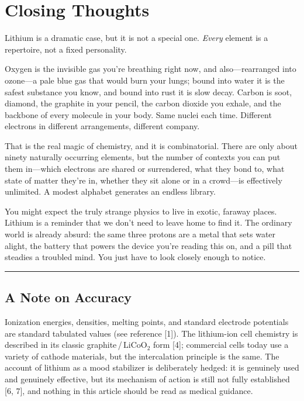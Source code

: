 \documentclass[11pt, letterpaper]{article}
\begin{document}

\section*{Closing Thoughts}

Lithium is a dramatic case, but it is not a special one. \textit{Every} element is a repertoire, not a fixed personality.

Oxygen is the invisible gas you're breathing right now, and also---rearranged into ozone---a pale blue gas that would burn your lungs; bound into water it is the safest substance you know, and bound into rust it is slow decay. Carbon is soot, diamond, the graphite in your pencil, the carbon dioxide you exhale, and the backbone of every molecule in your body. Same nuclei each time. Different electrons in different arrangements, different company.

That is the real magic of chemistry, and it is combinatorial. There are only about ninety naturally occurring elements, but the number of contexts you can put them in---which electrons are shared or surrendered, what they bond to, what state of matter they're in, whether they sit alone or in a crowd---is effectively unlimited. A modest alphabet generates an endless library.

You might expect the truly strange physics to live in exotic, faraway places. Lithium is a reminder that we don't need to leave home to find it. The ordinary world is already absurd: the same three protons are a metal that sets water alight, the battery that powers the device you're reading this on, and a pill that steadies a troubled mind. You just have to look closely enough to notice.

\vspace{1cm}
\begin{center}
\rule{0.4\textwidth}{0.5pt}
\end{center}

\vspace{1cm}

\subsection*{A Note on Accuracy}

Ionization energies, densities, melting points, and standard electrode potentials are standard tabulated values (see reference [1]). The lithium-ion cell chemistry is described in its classic graphite\,/\,$\text{LiCoO}_2$ form [4]; commercial cells today use a variety of cathode materials, but the intercalation principle is the same. The account of lithium as a mood stabilizer is deliberately hedged: it is genuinely used and genuinely effective, but its mechanism of action is still not fully established [6, 7], and nothing in this article should be read as medical guidance.
\end{document}
